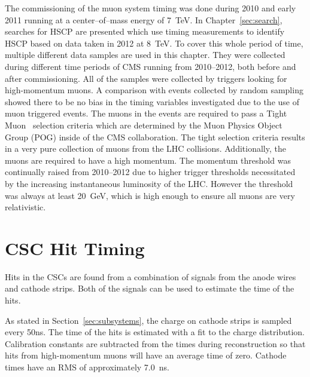 The commissioning of the muon system timing was done during 2010 and early 2011 running at a center--of--mass energy of 7~TeV.
In Chapter~\ref{sec:search}, searches for HSCP are presented which use
timing measurements to identify HSCP based on data taken in 2012 at 8~TeV.
To cover this whole period of time,
multiple different data samples are used in this chapter. They were collected during different time periods of CMS running from 2010--2012, both before and after commissioning.
All of the samples were collected by triggers looking for high-momentum muons. A comparison with events collected by random sampling showed there to be no
bias in the timing variables investigated due to the use of muon triggered events.
The muons in the events are required to pass a Tight Muon~\cite{2012JInst...7P0002T} selection 
criteria which are determined by the Muon Physics Object Group (POG) inside of the CMS collaboration.
The tight selection criteria results in a very pure collection of muons from the LHC collisions.
Additionally, the muons are required to have a high momentum. The momentum threshold was continually raised from 2010--2012 due to higher trigger thresholds
necessitated by the increasing instantaneous luminosity of the LHC.
However the threshold was always at least 20~GeV, which is high enough to ensure all muons are very relativistic.

\section{CSC Hit Timing}
Hits in the CSCs are found from a combination of signals from the anode wires and cathode strips. Both of the signals can be used to estimate the time of the hits.

As stated in Section~\ref{sec:subsystems}, the charge on cathode strips is sampled every 50ns.
The time of the hits is estimated with a fit to the charge distribution. Calibration constants are subtracted from the times during reconstruction 
so that hits from high-momentum muons will have an average time of zero.
Cathode times have an RMS of approximately 7.0~ns.


